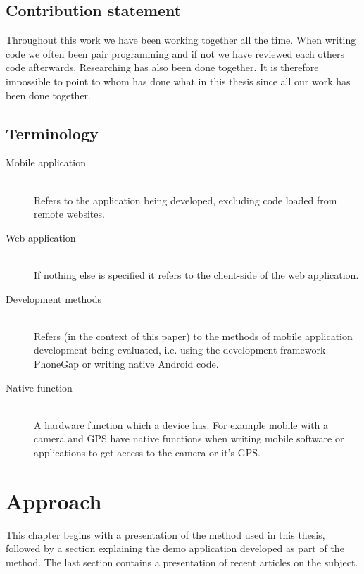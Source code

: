 \documentclass{cslthse-msc}
\begin{document}
\section{Contribution statement}
Throughout this work we have been working together all the time. When writing code we often been pair programming and if not we have reviewed each others code afterwards. Researching has also been done together. It is therefore impossible to point to whom has done what in this thesis since all our work has been done together. 


\section{Terminology}
\begin{description}
  \item[Mobile application] \hfill \\
    Refers to the application being developed, excluding code loaded from remote        websites.
  \item[Web application] \hfill \\
    If nothing else is specified it refers to the client-side of the web application.
  \item[Development methods] \hfill \\
    Refers (in the context of this paper) to the methods of mobile application          development being evaluated, i.e. using the development framework PhoneGap or       writing native Android code.
  \item[Native function] \hfill \\
     A hardware function which a device has. For example mobile with a camera and GPS have native functions when writing mobile software or applications to get access to the camera or it's GPS.
\end{description}


\chapter{Approach}
This chapter begins with a presentation of the method used in this thesis, followed by a section explaining the demo application developed as part of the method. The last section contains a presentation of recent articles on the subject. 
\end{document}

